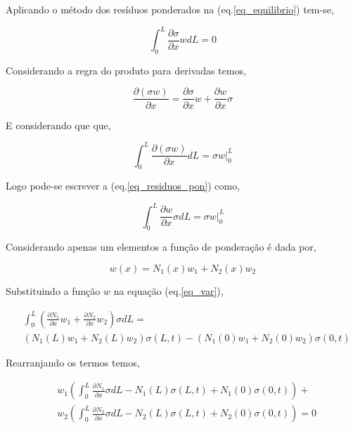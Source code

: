 \documentclass[12pt,a4paper]{article}
\newcommand{\diff}[1]{d#1}
\newcommand{\dd}[2]{\frac{\partial #1}{\partial #2}}
\begin{document}
Aplicando o método dos resíduos ponderados na (eq.\ref{eq_equilibrio}) tem-se,

\begin{equation}
\int_0^L{\dd{\sigma}{x}w\diff{L}} = 0
\label{eq_residuos_pon}
\end{equation} 

Considerando a regra do produto para derivadas temos,

\begin{equation}
\dd{(\sigma w)}{x} = \dd{\sigma}{x}w + \dd{w}{x}\sigma
\end{equation} 
 
E considerando que que,

\begin{equation}
\int_0^L \dd{(\sigma w)}{x} \diff{L} = \sigma w |_0^L
\end{equation} 
 
Logo pode-se escrever a (eq.\ref{eq_residuos_pon}) como,

\begin{equation}
\int_0^L \dd{w}{x}\sigma \diff{L} = \sigma w |_0^L
\label{eq_var}
\end{equation}

Considerando apenas um elementos a função de ponderação é dada por,

\begin{equation}
w(x) = N_1(x) w_1 + N_2(x) w_2
\end{equation} 
	
Substituindo a função $w$ na equação (eq.\ref{eq_var}),

\begin{equation}
\begin{split}
&\int_0^L \left( \dd{N_1}{x}w_1 + \dd{N_2}{x}w_2 \right)\sigma \diff{L} =\\
&\left(N_1(L) w_1 + N_2(L) w_2\right) \sigma\left(L,t\right) - \left(N_1(0) w_1 + N_2(0) w_2\right) \sigma\left(0,t\right)
\end{split}
\end{equation}
	
Rearranjando os termos temos,

\begin{equation}
\begin{split}
&w_1\left( \int_0^L \dd{N_1}{x}\sigma \diff{L} - N_1(L) \sigma\left(L,t\right) + N_1(0) \sigma\left(0,t\right) \right) +\\
&w_2\left( \int_0^L \dd{N_2}{x}\sigma \diff{L} - N_2(L) \sigma\left(L,t\right) + N_2(0) \sigma\left(0,t\right) \right) = 0
\end{split}
\end{equation}
\end{document}
